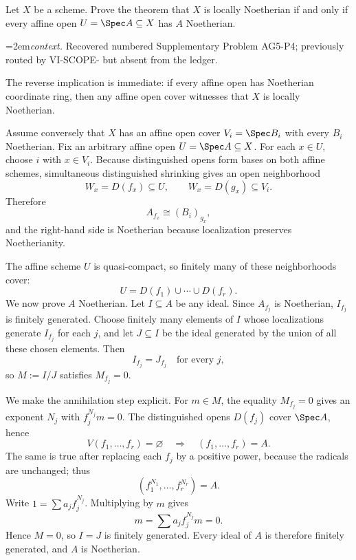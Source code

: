 \begin{problem}\label{prob:vi26-p01}
Let \(X\) be a scheme.  Prove the theorem that \(X\) is locally Noetherian if and only if every affine open \(U=\Spec A\subseteq X\) has \(A\) Noetherian.
\par\smallskip\begingroup\emergencystretch=2em\noindent\textit{context.} Recovered numbered Supplementary Problem AG5-P4; previously routed by VI-SCOPE- but absent from the ledger.\par\endgroup
\end{problem}

\ifdefined\FullProblemDossiers
\begin{solution}
The reverse implication is immediate: if every affine open has Noetherian coordinate ring, then any
affine open cover witnesses that \(X\) is locally Noetherian.

Assume conversely that \(X\) has an affine open cover \(V_i=\Spec B_i\) with every \(B_i\)
Noetherian.  Fix an arbitrary affine open \(U=\Spec A\subseteq X\).  For each \(x\in U\), choose
\(i\) with \(x\in V_i\).  Because distinguished opens form bases on both affine schemes, simultaneous
distinguished shrinking gives an open neighborhood
\[
W_x=D(f_x)\subseteq U,\qquad W_x=D(g_x)\subseteq V_i.
\]
Therefore
\[
A_{f_x}\cong (B_i)_{g_x},
\]
and the right-hand side is Noetherian because localization preserves Noetherianity.

The affine scheme \(U\) is quasi-compact, so finitely many of these neighborhoods cover:
\[
U=D(f_1)\cup\cdots\cup D(f_r).
\]
We now prove \(A\) Noetherian.  Let \(I\subseteq A\) be any ideal.  Since \(A_{f_j}\) is
Noetherian, \(I_{f_j}\) is finitely generated.  Choose finitely many elements of \(I\) whose
localizations generate \(I_{f_j}\) for each \(j\), and let \(J\subseteq I\) be the ideal generated
by the union of all these chosen elements.  Then
\[
I_{f_j}=J_{f_j}\quad\text{for every }j,
\]
so \(M:=I/J\) satisfies \(M_{f_j}=0\).

We make the annihilation step explicit.  For \(m\in M\), the equality \(M_{f_j}=0\) gives an exponent
\(N_j\) with \(f_j^{N_j}m=0\).  The distinguished opens \(D(f_j)\) cover \(\Spec A\), hence
\[
V(f_1,\ldots,f_r)=\varnothing
\quad\Longrightarrow\quad
(f_1,\ldots,f_r)=A.
\]
The same is true after replacing each \(f_j\) by a positive power, because the radicals are
unchanged; thus
\[
(f_1^{N_1},\ldots,f_r^{N_r})=A.
\]
Write \(1=\sum a_j f_j^{N_j}\).  Multiplying by \(m\) gives
\[
m=\sum a_j f_j^{N_j}m=0.
\]
Hence \(M=0\), so \(I=J\) is finitely generated.  Every ideal of \(A\) is therefore finitely
generated, and \(A\) is Noetherian.
\end{solution}
\fi
